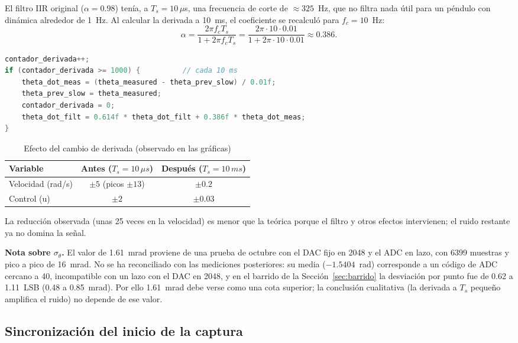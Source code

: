 \documentclass[11pt,a4paper]{article}
\begin{document}
El filtro IIR original ($\alpha=0.98$) tenía, a $T_s=10\,\mu$s, una frecuencia de corte de $\approx 325$~Hz, que no filtra nada útil para un péndulo con dinámica alrededor de 1~Hz. Al calcular la derivada a 10~ms, el coeficiente se recalculó para $f_c=10$~Hz:
\begin{equation}
\alpha=\frac{2\pi f_c T_s}{1+2\pi f_c T_s}=\frac{2\pi\cdot 10\cdot 0.01}{1+2\pi\cdot 10\cdot 0.01}\approx 0.386 .
\end{equation}
\begin{lstlisting}[language=C]
contador_derivada++;
if (contador_derivada >= 1000) {          // cada 10 ms
    theta_dot_meas = (theta_measured - theta_prev_slow) / 0.01f;
    theta_prev_slow = theta_measured;
    contador_derivada = 0;
    theta_dot_filt = 0.614f * theta_dot_filt + 0.386f * theta_dot_meas;
}
\end{lstlisting}

\begin{table}[H]
\centering
\caption{Efecto del cambio de derivada (observado en las gráficas)}
\begin{tabular}{lcc}
\hline
\textbf{Variable} & \textbf{Antes ($T_s=10\,\mu s$)} & \textbf{Después ($T_s=10\,ms$)} \\
\hline
Velocidad (rad/s) & $\pm 5$ (picos $\pm 13$) & $\pm 0.2$ \\
Control (u) & $\pm 2$ & $\pm 0.03$ \\
\hline
\end{tabular}
\end{table}

La reducción observada (unas 25 veces en la velocidad) es menor que la teórica porque el filtro y otros efectos intervienen; el ruido restante ya no domina la señal.

\textbf{Nota sobre $\sigma_\theta$.} El valor de 1.61~mrad proviene de una prueba de octubre con el DAC fijo en 2048 y el ADC en lazo, con 6399 muestras y pico a pico de 16~mrad. No se ha reconciliado con las mediciones posteriores: su media ($-1.5404$~rad) corresponde a un código de ADC cercano a 40, incompatible con un lazo con el DAC en 2048, y en el barrido de la Sección~\ref{sec:barrido} la desviación por punto fue de 0.62 a 1.11~LSB (0.48 a 0.85~mrad). Por ello 1.61~mrad debe verse como una cota superior; la conclusión cualitativa (la derivada a $T_s$ pequeño amplifica el ruido) no depende de ese valor.

\subsection{Sincronización del inicio de la captura}
\end{document}
